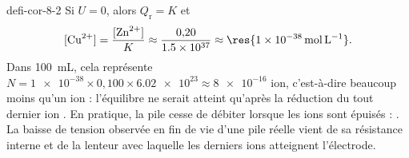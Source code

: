 \begin{blocEdition}{defi-cor-8-2}
\label{figedition-defi-cor-8-2-1}
Si $U=0$, alors $Q_\mathrm{r}=K$ et
\[[\ce{Cu^2+}]=\frac{[\ce{Zn^2+}]}{K}\approx\frac{0{,}20}{\num{1.5e37}}\approx\res{\qty{1e-38}{mol.L^{-1}}}.\]
Dans 100~mL, cela représente $N=\num{1e-38}\times0{,}100\times\num{6.02e23}\approx\num{8e-16}$ ion, c'est-à-dire beaucoup moins
qu'un ion : l'équilibre ne serait atteint qu'après la réduction du tout dernier ion . En pratique, la pile
cesse de débiter lorsque les ions  sont épuisés : . La baisse de tension observée en fin de vie d'une pile réelle vient de sa résistance interne et de la
lenteur avec laquelle les derniers ions atteignent l'électrode.
\end{blocEdition}

